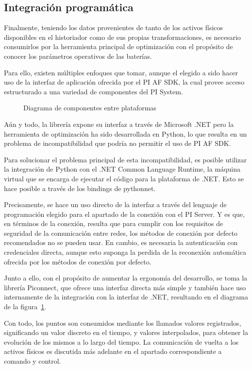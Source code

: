\subsection{Integración programática}
\label{makereference3.5.2}

Finalmente, teniendo los datos provenientes de tanto de los activos físicos disponibles en el historiador como de sus propias transformaciones, es necesario consumirlos por la herramienta principal de optimización con el propósito de conocer los parámetros operativos de las baterías.

Para ello, existen múltiples enfoques que tomar, aunque el elegido a sido hacer uso de la interfaz de aplicación ofrecida por el PI AF SDK, la cual provee acceso estructurado a una variedad de componentes del PI System.

\begin{figure}
\centering
\caption{Diagrama de componentes entre plataformas}
\label{fig:integración-programática}
\end{figure}

Aún y todo, la librería expone su interfaz a través de Microsoft .NET pero la herramienta de optimización ha sido desarrollada en Python, lo que resulta en un problema de incompatibilidad que podría no permitir el uso de PI AF SDK.

Para solucionar el problema principal de esta incompatibilidad, es posible utilizar la integración de Python con el .NET Common Language Runtime, la máquina virtual que se encarga de ejecutar el código para la plataforma de .NET. Esto se hace posible a través de los bindings de pythonnet.

Precisamente, se hace un uso directo de la interfaz a través del lenguaje de programación elegido para el apartado de la conexión con el PI Server. Y es que, en términos de la conexión, resulta que para cumplir con los requisitos de seguridad de la comunicación entre redes, los métodos de conexión por defecto recomendados no se pueden usar. En cambio, es necesaria la autenticación con credenciales directa, aunque esto suponga la perdida de la reconexión automática ofrecida por los métodos de conexión por defecto.

Junto a ello, con el propósito de aumentar la ergonomía del desarrollo, se toma la librería Piconnect, que ofrece una interfaz directa más simple y también hace uso internamente de la integración con la interfaz de .NET, resultando en el diagrama de la figura~\ref{fig:integración-programática}.

Con todo, los puntos son consumidos mediante los llamados valores registrados, significando un valor discreto en el tiempo, y valores interpolados, para obtener la evolución de los mismos a lo largo del tiempo. La comunicación de vuelta a los activos físicos es discutida más adelante en el apartado correspondiente a comando y control.
